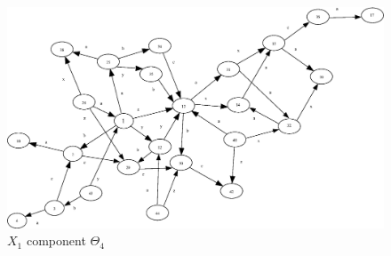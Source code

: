 \documentclass[a4paper,12pt]{article}
\numberwithin{equation}{section}
\numberwithin{figure}{section}
\begin{document}
\begin{figure}
\begin{center}
\includegraphics[scale=0.55, bb=0 0 710 420]{ex_K_f4.eps}
\caption{$X_1$ component $\Theta_4$}
\label{fig:K_f4}
\end{center}
\end{figure}
\end{document}
